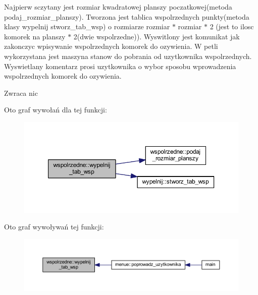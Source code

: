 Najpierw sczytany jest rozmiar kwadratowej planszy poczatkowej(metoda podaj\+\_\+rozmiar\+\_\+planszy). Tworzona jest tablica wspolrzednych punkty(metoda klasy wypelnij stworz\+\_\+tab\+\_\+wsp) o rozmiarze rozmiar $\ast$ rozmiar $\ast$ 2 (jest to ilosc komorek na planszy $\ast$ 2(dwie wspolrzedne)). Wyswitlony jest komunikat jak zakonczyc wpisywanie wspolrzednych komorek do ozywienia. W petli wykorzystana jest maszyna stanow do pobrania od uzytkownika wspolrzednych. Wyswietlany komentarz prosi uzytkownika o wybor sposobu wprowadzenia wspolrzednych komorek do ozywienia. \begin{DoxyReturn}{Zwraca}
nic 
\end{DoxyReturn}
Oto graf wywołań dla tej funkcji\+:
\nopagebreak
\begin{figure}[H]
\begin{center}
\leavevmode
\includegraphics[width=350pt]{classwspolrzedne_a9995d04ed35891918459a091284fa76f_cgraph}
\end{center}
\end{figure}
Oto graf wywoływań tej funkcji\+:
\nopagebreak
\begin{figure}[H]
\begin{center}
\leavevmode
\includegraphics[width=350pt]{classwspolrzedne_a9995d04ed35891918459a091284fa76f_icgraph}
\end{center}
\end{figure}
\mbox{\label{classwspolrzedne_a9fcebd535a4a970e7007be5b13791fbf}} 
